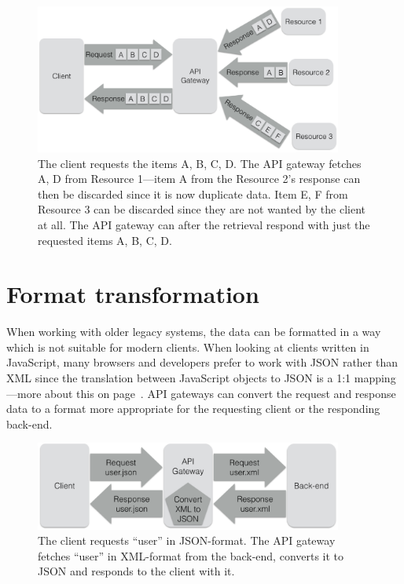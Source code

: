 \documentclass{cslthse-msc}
\begin{document}
\begin{figure}[H]
  \centering
    \begin{center}
      \includegraphics[width=0.9\textwidth]{images/api_gateway_duplicate.png}
    \end{center}
  \caption{The client requests the items A, B, C, D. The API gateway fetches A, D from Resource 1---item A from the Resource 2's response can then be discarded since it is now duplicate data. Item E, F from Resource 3 can be discarded since they are not wanted by the client at all. The API gateway can after the retrieval respond with just the requested items A, B, C, D.}
\end{figure}

\section{Format transformation}
When working with older legacy systems, the data can be formatted in a way which is not suitable for modern clients. When looking at clients written in JavaScript, many browsers and developers prefer to work with JSON rather than XML since the translation between JavaScript objects to JSON is a 1:1 mapping---more about this on page~\pageref{xml_json}. API gateways can convert the request and response data to a format more appropriate for the requesting client or the responding back-end.

\begin{figure}[H]
  \centering
    \begin{center}
      \includegraphics[width=0.9\textwidth]{images/api_gateway_transform.png}
    \end{center}
  \caption{The client requests \enquote{user} in JSON-format. The API gateway fetches \enquote{user} in XML-format from the back-end, converts it to JSON and responds to the client with it.}
\end{figure}
\end{document}
